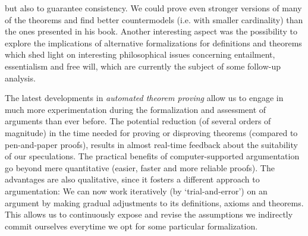 \begin{isabellebody}
\begin{isamarkuptext}
but also to guarantee consistency. We could prove even stronger versions
of many of the theorems and find better countermodels (i.e. with smaller cardinality) than the ones presented in his book.
Another interesting aspect was the possibility to explore the implications of alternative formalizations
for definitions and theorems which shed light on interesting philosophical issues concerning entailment,
essentialism and free will, which are currently the subject of some follow-up analysis.%
\end{isamarkuptext}\isamarkuptrue%
%
\begin{isamarkuptext}%
The latest developments in \emph{automated theorem proving} allow us to engage in much more experimentation
during the formalization and assessment of arguments than ever before. The potential reduction (of several orders of magnitude)
in the time needed for proving or disproving theorems (compared to pen-and-paper proofs), results in almost real-time
feedback about the suitability of our speculations. The practical benefits of computer-supported argumentation go beyond
mere quantitative (easier, faster and more reliable proofs). The advantages are also qualitative, since it fosters a
different approach to argumentation: We can now work iteratively (by `trial-and-error') on an argument
by making gradual adjustments to its definitions, axioms and theorems. This allows us to continuously expose and revise 
the assumptions we indirectly commit ourselves everytime we opt for some particular formalization.%
\end{isamarkuptext}\isamarkuptrue%
%
%
%
%
%
%
%
\end{isabellebody}%
